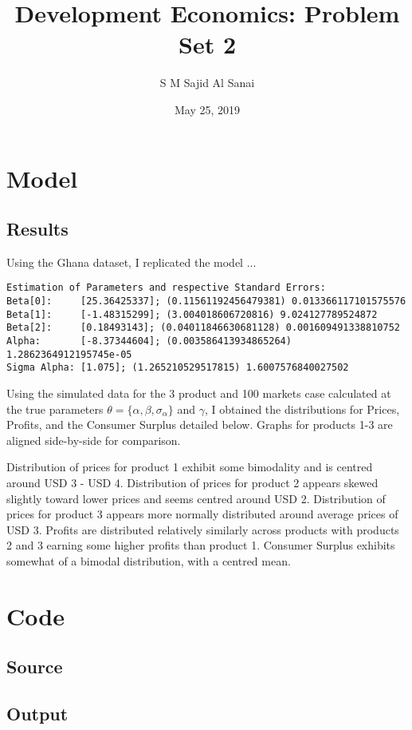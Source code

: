 \documentclass{article}
\title{Development Economics: Problem Set 2}
\author{S M Sajid Al Sanai}
\date{May 25, 2019}
\begin{document}
\maketitle
{}
\tableofcontents


\newpage

\section{Model}

\subsection{Results}

Using the Ghana dataset, I replicated the model ...

\begin{lstlisting}
Estimation of Parameters and respective Standard Errors:
Beta[0]:     [25.36425337]; (0.11561192456479381) 0.013366117101575576
Beta[1]:     [-1.48315299]; (3.004018606720816) 9.024127789524872
Beta[2]:     [0.18493143]; (0.04011846630681128) 0.001609491338810752
Alpha:       [-8.37344604]; (0.003586413934865264) 1.2862364912195745e-05
Sigma Alpha: [1.075]; (1.265210529517815) 1.6007576840027502
\end{lstlisting}

Using the simulated data for the 3 product and 100 markets case calculated at the true parameters $\theta=\{\alpha, \beta, \sigma_\alpha\}$ and $\gamma$, I obtained the distributions for Prices, Profits, and the Consumer Surplus detailed below. Graphs for products 1-3 are aligned side-by-side for comparison.
\par Distribution of prices for product 1 exhibit some bimodality and is centred around USD 3 - USD 4. Distribution of prices for product 2 appears skewed slightly toward lower prices and seems centred around USD 2. Distribution of prices for product 3 appears more normally distributed around average prices of USD 3. Profits are distributed relatively similarly across products with products 2 and 3 earning some higher profits than product 1. Consumer Surplus exhibits somewhat of a bimodal distribution, with a centred mean.

\newpage

\section{Code}

\subsection{Source}


\subsection{Output}

\end{document}
